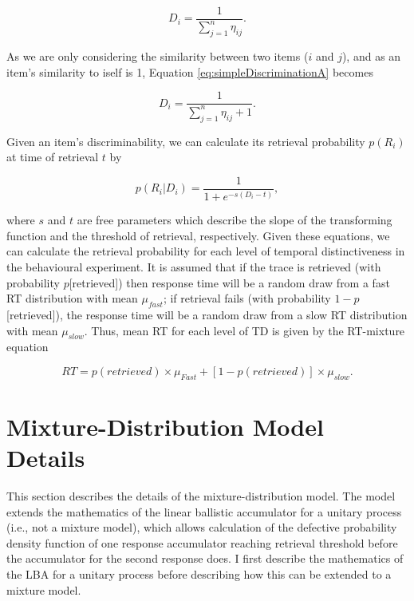 \documentclass[a4paper, jou, natbib]{apa6}
\begin{document}
\begin{equation}
D_{i} = \frac{1}{\sum\limits_{j = 1}^n \eta_{ij}}.
\label{eq:simpleDiscriminationA}
\end{equation}

As we are only considering the similarity between two items ($i$ and $j$), and as an item's similarity to iself is 1, Equation \ref{eq:simpleDiscriminationA} becomes

\begin{equation}
D_{i} = \frac{1}{\sum\limits_{j = 1}^n \eta_{ij} + 1}.
\label{eq:simpleDiscriminationB}
\end{equation}

Given an item's discriminability, we can calculate its retrieval probability $p(R_{i})$ at time of retrieval $t$ by

\begin{equation}
p(R_{i}|D_{i}) = \frac{1}{1 + e^{-s(D_{i} - t)}}, 
\label{eq:simpleProb}
\end{equation}

\noindent where $s$ and $t$ are free parameters which describe the slope of the transforming function and the threshold of retrieval, respectively. Given these equations, we can calculate the retrieval probability for each level of temporal distinctiveness in the behavioural experiment. It is assumed that if the trace is retrieved (with probability $p$[retrieved]) then response time will be a random draw from a fast RT distribution with mean $\mu_{fast}$; if retrieval fails (with probability $1 - p$[retrieved]), the response time will be a random draw from a slow RT distribution with mean $\mu_{slow}$. Thus, mean RT for each level of TD is given by the RT-mixture equation

\begin{equation}
RT = p(retrieved) \times \mu_{Fast} + [1 - p(retrieved)] \times \mu_{slow}.
\label{eq:tdMixtureNew}
\end{equation}
\appendix
\section{Mixture-Distribution Model Details}

This section describes the details of the mixture-distribution model. The model extends the mathematics of the linear ballistic accumulator \citep{Brown2008} for a unitary process (i.e., not a mixture model), which allows calculation of the defective probability density function of one response accumulator reaching retrieval threshold before the accumulator for the second response does. I first describe the mathematics of the LBA for a unitary process before describing how this can be extended to a mixture model. 
\end{document}

